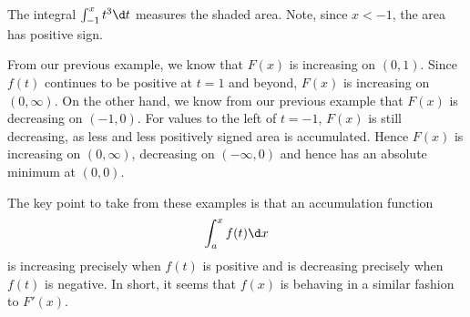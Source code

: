 \begin{marginfigure}
\caption{The integral $\int_{-1}^x t^3 \d t$ measures the shaded
  area. Note, since $x<-1$, the area has positive sign.}
\label{figure:accumulationegreal}
\end{marginfigure}

\begin{solution}
From our previous example, we know that $F(x)$ is increasing on
$(0,1)$. Since $f(t)$ continues to be positive at $t=1$ and beyond,
  $F(x)$ is increasing on $(0,\infty)$. On the other hand, we know
  from our previous example that $F(x)$ is decreasing on $(-1,0)$. For
  values to the left of $t=-1$, $F(x)$ is still decreasing, as less
  and less positively signed area is accumulated. Hence $F(x)$ is
  increasing on $(0,\infty)$, decreasing on $(-\infty,0)$ and hence
  has an absolute minimum at $(0,0)$.
\end{solution}

The key point to take from these examples is that an accumulation function
\[
\int_a^x f(t) \d x 
\]
is increasing precisely when $f(t)$ is positive and is decreasing
precisely when $f(t)$ is negative. In short, it seems that $f(x)$ is
behaving in a similar fashion to $F'(x)$.




